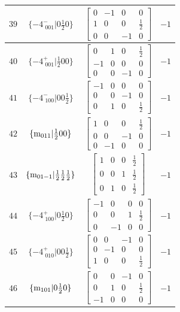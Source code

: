 \documentclass[fleqn,8pt]{jsarticle}
\begin{document}
\begin{longtable}{cccc}
$ 39 $ & $ \{-4^{-}_{\,\,001}|0 \frac{1}{2} 0\} $ & $ \begin{bmatrix} 0 & -1 & 0 & 0 \\ 1 & 0 & 0 & \frac{1}{2} \\ 0 & 0 & -1 & 0 \end{bmatrix} $ & $ -1 $ \\ \hline
$ 40 $ & $ \{-4^{+}_{\,\,001}|\frac{1}{2} 0 0\} $ & $ \begin{bmatrix} 0 & 1 & 0 & \frac{1}{2} \\ -1 & 0 & 0 & 0 \\ 0 & 0 & -1 & 0 \end{bmatrix} $ & $ -1 $ \\ \hline
$ 41 $ & $ \{-4^{-}_{\,\,100}|0 0 \frac{1}{2}\} $ & $ \begin{bmatrix} -1 & 0 & 0 & 0 \\ 0 & 0 & -1 & 0 \\ 0 & 1 & 0 & \frac{1}{2} \end{bmatrix} $ & $ -1 $ \\ \hline
$ 42 $ & $ \{{\rm m}_{011}|\frac{1}{2} 0 0\} $ & $ \begin{bmatrix} 1 & 0 & 0 & \frac{1}{2} \\ 0 & 0 & -1 & 0 \\ 0 & -1 & 0 & 0 \end{bmatrix} $ & $ -1 $ \\ \hline
$ 43 $ & $ \{{\rm m}_{01-1}|\frac{1}{2} \frac{1}{2} \frac{1}{2}\} $ & $ \begin{bmatrix} 1 & 0 & 0 & \frac{1}{2} \\ 0 & 0 & 1 & \frac{1}{2} \\ 0 & 1 & 0 & \frac{1}{2} \end{bmatrix} $ & $ -1 $ \\ \hline
$ 44 $ & $ \{-4^{+}_{\,\,100}|0 \frac{1}{2} 0\} $ & $ \begin{bmatrix} -1 & 0 & 0 & 0 \\ 0 & 0 & 1 & \frac{1}{2} \\ 0 & -1 & 0 & 0 \end{bmatrix} $ & $ -1 $ \\ \hline
$ 45 $ & $ \{-4^{+}_{\,\,010}|0 0 \frac{1}{2}\} $ & $ \begin{bmatrix} 0 & 0 & -1 & 0 \\ 0 & -1 & 0 & 0 \\ 1 & 0 & 0 & \frac{1}{2} \end{bmatrix} $ & $ -1 $ \\ \hline
$ 46 $ & $ \{{\rm m}_{101}|0 \frac{1}{2} 0\} $ & $ \begin{bmatrix} 0 & 0 & -1 & 0 \\ 0 & 1 & 0 & \frac{1}{2} \\ -1 & 0 & 0 & 0 \end{bmatrix} $ & $ -1 $ \\ \hline

\end{longtable}
\end{document}
